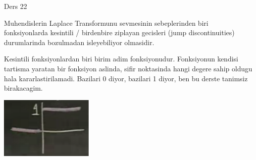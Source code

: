\documentclass[12pt,fleqn]{article}
\begin{document}
Ders 22

Muhendislerin Laplace Transformunu sevmesinin sebeplerinden biri
fonksiyonlarda kesintili / birdenbire ziplayan gecisleri (jump
discontinuities) durumlarinda bozulmadan isleyebiliyor olmasidir. 

Kesintili fonksiyonlardan biri birim adim fonksiyonudur. Fonksiyonun
kendisi tartisma yaratan bir fonksiyon aslinda, sifir noktasinda hangi
degere sahip oldugu hala kararlastirilamadi. Bazilari 0 diyor, bazilari 1
diyor, ben bu derste tanimsiz birakacagim. 

\includegraphics[height=3cm]{22_1.png}
\end{document}

